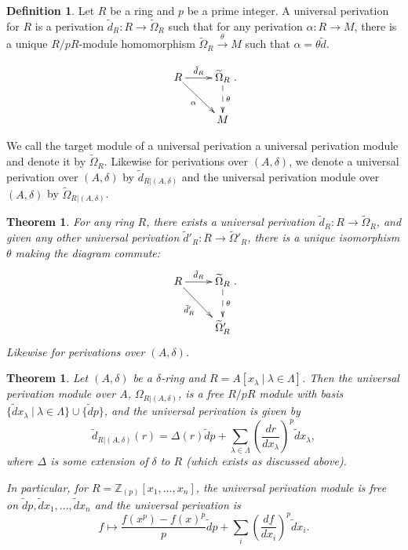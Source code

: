 \documentclass{amsart}[12pt]
\newcommand{\Z}{\mathbb{Z}}
\numberwithin{equation}{section}
\theoremstyle{plain} %
\newtheorem{thm}[equation]{Theorem}
\theoremstyle{definition}
\newtheorem{defn}[equation]{Definition}
\theoremstyle{remark}
\newcommand{\xra}[1]{\xrightarrow{#1}}
\begin{document}
\begin{defn} Let $R$ be a ring and $p$ be a prime integer. A universal perivation for $R$ is a perivation $\tilde{d}_R:R \to \widetilde{\Omega}_{R}$ such that for any perivation $\alpha:R \to M$, there is a unique $R/pR$-module homomorphism $\widetilde{\Omega}_{R} \xra{\theta} M$ such that $\alpha = \theta \tilde{d}$. 

\[  \xymatrix{  R \ar[r]^-{{\tilde{d}}_{R}} \ar[dr]_-{\alpha} & {\widetilde{\Omega}}_{R} \ar@{-->}[d]^-{\theta} \\ & M}.\]

We call the target module of a universal perivation a universal perivation module and denote it by $\widetilde{\Omega}_{R}$. Likewise for 
perivations over $(A,\delta)$, we denote a universal perivation over $(A,\delta)$ by $\tilde{d}_{R|(A,\delta)}$ and the universal perivation module over $(A,\delta)$ by $\widetilde{\Omega}_{R|(A,\delta)}$.
\end{defn}

\begin{thm} For any ring $R$, there exists a universal perivation $\tilde{d}_R:R \to \widetilde{\Omega}_{R}$, and given any other universal perivation $\tilde{d}'_R:R \to \widetilde{\Omega}'_{R}$, there is a unique isomorphism $\theta$ making the diagram commute:
\[  \xymatrix{  R \ar[r]^-{{\tilde{d}}_{R}} \ar[dr]_-{{\tilde{d}'}_{R}} & {\widetilde{\Omega}}_{R} \ar@{-->}[d]^-{\theta} \\ & \widetilde{\Omega}'_{R} }.\]
Likewise for perivations over $(A,\delta)$.
\end{thm}

\begin{thm} Let $(A,\delta)$ be a $\delta$-ring and $R= A[x_{\lambda} \ | \ \lambda\in \Lambda]$. Then the universal perivation module over $A$, $\Omega_{R|(A,\delta)}$, is a free $R/pR$ module with basis $\{ \tilde{d}x_{\lambda} \ | \ \lambda\in \Lambda\} \cup \{ \tilde{d}p\}$, and the universal perivation is given by
\[ \tilde{d}_{R|(A,\delta)} (r) = \Delta(r) \tilde{d}p + \sum_{\lambda\in \Lambda} (\frac{dr}{dx_\lambda})^p \tilde{d}x_{\lambda},\]
where $\Delta$ is some extension of $\delta$ to $R$ (which exists as discussed above).

In particular, for $R=\Z_{(p)}[x_1,\dots,x_n]$, the universal perivation module is free on $\tilde{d}p, \tilde{d}x_1,\dots,\tilde{d}x_n$ and the universal perivation is 
\[ f\mapsto \frac{f(x^p) - f(x)^p}{p} \tilde{d}p + \sum_i (\frac{df}{dx_i})^p \tilde{d}x_i.\]
\end{thm}
\end{document}
